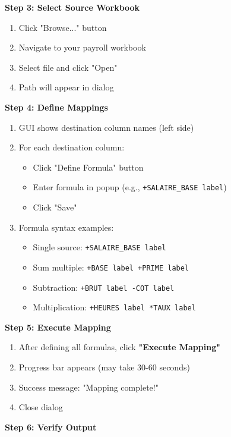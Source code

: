 \textbf{Step 3: Select Source Workbook}

\begin{enumerate}
    \item Click "Browse..." button
    \item Navigate to your payroll workbook
    \item Select file and click "Open"
    \item Path will appear in dialog
\end{enumerate}

\textbf{Step 4: Define Mappings}

\begin{enumerate}
    \item GUI shows destination column names (left side)
    \item For each destination column:
    \begin{itemize}
        \item Click "Define Formula" button
        \item Enter formula in popup (e.g., \texttt{+SALAIRE\_BASE label})
        \item Click "Save"
    \end{itemize}
    
    \item Formula syntax examples:
    \begin{itemize}
        \item Single source: \texttt{+SALAIRE\_BASE label}
        \item Sum multiple: \texttt{+BASE label +PRIME label}
        \item Subtraction: \texttt{+BRUT label -COT label}
        \item Multiplication: \texttt{+HEURES label *TAUX label}
    \end{itemize}
\end{enumerate}

\textbf{Step 5: Execute Mapping}

\begin{enumerate}
    \item After defining all formulas, click \textbf{"Execute Mapping"}
    \item Progress bar appears (may take 30-60 seconds)
    \item Success message: "Mapping complete!"
    \item Close dialog
\end{enumerate}

\textbf{Step 6: Verify Output}

